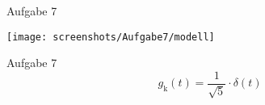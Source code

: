 \begin{frame}{Aufgabe 7}
  \begin{center}
  \texttt{[image: screenshots/Aufgabe7/modell]}
  \end{center}
\end{frame}

\begin{frame}{Aufgabe 7}
  \[g_\mathrm{k}(t) = \frac{1}{\sqrt{5}} \cdot \delta(t)\]
\end{frame}